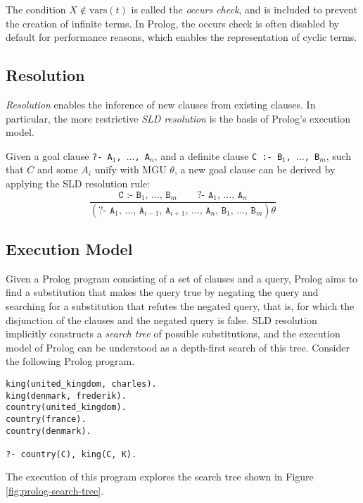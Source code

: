 The condition $X \notin \text{vars}(t)$ is called the \emph{occurs check}, and is included to prevent the creation of infinite terms. In Prolog, the occurs check is often disabled by default for performance reasons, which enables the representation of cyclic terms.

\subsection{Resolution}

\emph{Resolution} enables the inference of new clauses from existing clauses. In particular, the more restrictive \emph{SLD resolution} is the basis of Prolog's execution model.

Given a goal clause \texttt{?- A$_1$, $\ldots$, A$_n$}, and a definite clause \texttt{C :- B$_1$, $\ldots$, B$_m$}, such that $C$ and some $A_i$ unify with MGU $\theta$, a new goal clause can be derived by applying the SLD resolution rule:
$$
\frac{\texttt{C :- B$_1$, $\ldots$, B$_m$} \qquad \texttt{?- A$_1$, $\ldots$, A$_n$}}{(\texttt{?- A$_1$, $\ldots$, A$_{i-1}$, A$_{i+1}$, $\ldots$, A$_n$, B$_1$, $\ldots$, B$_m$})\theta}
$$

\subsection{Execution Model}

Given a Prolog program consisting of a set of clauses and a query, Prolog aims to find a substitution that makes the query true by negating the query and searching for a substitution that refutes the negated query, that is, for which the disjunction of the clauses and the negated query is false. SLD resolution implicitly constructs a \emph{search tree} of possible substitutions, and the execution model of Prolog can be understood as a depth-first search of this tree. Consider the following Prolog program.

\begin{center}
\begin{verbatim}
king(united_kingdom, charles).
king(denmark, frederik).
country(united_kingdom).
country(france).
country(denmark).

?- country(C), king(C, K).
\end{verbatim}
\end{center}

The execution of this program explores the search tree shown in Figure \ref{fig:prolog-search-tree}.

